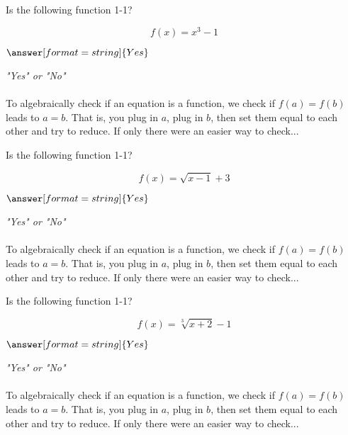 \documentclass{ximera}
\begin{document}
\begin{question}
Is the following function 1-1?
 
$$ f(x) = x^3 - 1 $$
 
$\answer[format=string]{Yes}$
 
\begin{hint}
\textit{"Yes" or "No"} \\ \\
To algebraically check if an equation is a function, we check if $f(a) = f(b)$ leads to $a = b$. That is, you plug in $a$, plug in $b$, then set them equal to each other and try to reduce. If only there were an easier way to check...
\end{hint}
 
\end{question}
 
\begin{question}
Is the following function 1-1?
 
$$ f(x) = \sqrt{x-1}+3 $$
 
$\answer[format=string]{Yes}$
 
\begin{hint}
\textit{"Yes" or "No"} \\ \\
To algebraically check if an equation is a function, we check if $f(a) = f(b)$ leads to $a = b$. That is, you plug in $a$, plug in $b$, then set them equal to each other and try to reduce. If only there were an easier way to check...
\end{hint}
 
\end{question}
 
\begin{question}
Is the following function 1-1?
 
$$ f(x) = \sqrt[3]{x+2}-1 $$
 
$\answer[format=string]{Yes}$
 
\begin{hint}
\textit{"Yes" or "No"} \\ \\
To algebraically check if an equation is a function, we check if $f(a) = f(b)$ leads to $a = b$. That is, you plug in $a$, plug in $b$, then set them equal to each other and try to reduce. If only there were an easier way to check...
\end{hint}
 
\end{question}
 
\end{document}
